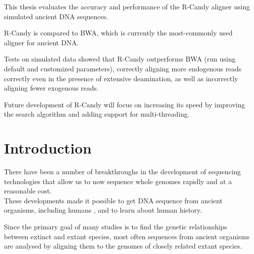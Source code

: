 \documentclass[11pt,a4paper]{report}
\begin{document}
This thesis evaluates the accuracy and performance of the R-Candy aligner 
using simulated ancient DNA sequences. 

R-Candy is compared to BWA, which is currently the most-commonly used 
aligner for ancient DNA.

Tests on simulated data showed that R-Candy outperforms BWA (run using 
default and customized parameters), correctly aligning more endogenous 
reads correctly even in the presence of extensive deamination, as well
as incorrectly aligning fewer exogenous reads.

Future development of R-Candy will focus on increasing its speed by 
improving the search algorithm and adding support for multi-threading.



\newpage\null\thispagestyle{empty}\newpage

\tableofcontents
\newpage\null\thispagestyle{empty}\newpage
\listoftables
\newpage\null\thispagestyle{empty}\newpage
\listoffigures
\newpage\null\thispagestyle{empty}\newpage
{} 



\section{Introduction} \label{Introduction}


There have been a number of breakthroughs in the development of sequencing 
technologies that allow us to now sequence whole genomes rapidly and at a 
reasonable cost\cite{NGS}\cite{454}\cite{NGS2}.
\\
These developments made it possible to get DNA sequence from ancient 
organisms, including humans \cite{AncientDNA}\cite{fish2human}, and  
to learn about human history\cite{impactOFhg}\cite{ourGenome}\cite{SNP}.

Since the primary goal of many studies is to find the genetic 
relationships between extinct and extant species, most often sequences 
from ancient organisms are analysed by aligning them to the genomes of 
closely related extant species\cite{Neanthertal}\cite{AncientDNA}.
\end{document}
